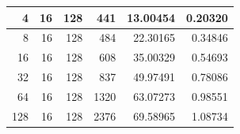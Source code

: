 \documentclass[journal,transmag]{IEEEtran}
\begin{document}
\begin{table}[h]
\begin{tabular}{|r|r|r|r|r|r|}
		4                             & 16                         & 128                              & 441                            & 13.00454                      & 0.20320                         \\ \hline
		8                             & 16                         & 128                              & 484                            & 22.30165                      & 0.34846                         \\ \hline
		16                            & 16                         & 128                              & 608                            & 35.00329                      & 0.54693                         \\ \hline
		32                            & 16                         & 128                              & 837                            & 49.97491                      & 0.78086                         \\ \hline
		64                            & 16                         & 128                              & 1320                           & 63.07273                      & 0.98551                         \\ \hline
		128                           & 16                         & 128                              & 2376                           & 69.58965                      & 1.08734                         \\ \hline
	\end{tabular}
\end{table}
	\newpage
	
\end{document}
